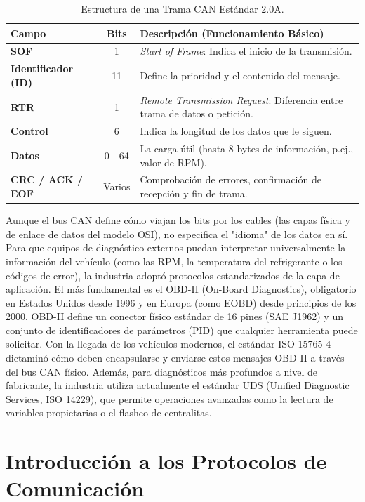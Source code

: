 \begin{table}[!htbp]
\caption{Estructura de una Trama CAN Estándar 2.0A.}
\label{tab:trama_can}
\centering
\begin{tabular}{|l|c|p{9cm}|}
\hline
\textbf{Campo} & \textbf{Bits} & \textbf{Descripción (Funcionamiento Básico)} \\ \hline
\textbf{SOF} & 1 & \textit{Start of Frame}: Indica el inicio de la transmisión. \\ \hline
\textbf{Identificador (ID)} & 11 & Define la prioridad y el contenido del mensaje. \\ \hline
\textbf{RTR} & 1 & \textit{Remote Transmission Request}: Diferencia entre trama de datos o petición. \\ \hline
\textbf{Control} & 6 & Indica la longitud de los datos que le siguen. \\ \hline
\textbf{Datos} & 0 - 64 & La carga útil (hasta 8 bytes de información, p.ej., valor de RPM). \\ \hline
\textbf{CRC / ACK / EOF} & Varios & Comprobación de errores, confirmación de recepción y fin de trama. \\ \hline
\end{tabular}%
\end{table}

Aunque el bus CAN define cómo viajan los bits por los cables (las capas física y de enlace de datos del modelo OSI), no especifica el "idioma" de los datos en sí. Para que equipos de diagnóstico externos puedan interpretar universalmente la información del vehículo (como las RPM, la temperatura del refrigerante o los códigos de error), la industria adoptó protocolos estandarizados de la capa de aplicación. El más fundamental es el OBD-II (On-Board Diagnostics), obligatorio en Estados Unidos desde 1996 y en Europa (como EOBD) desde principios de los 2000. OBD-II define un conector físico estándar de 16 pines (SAE J1962) y un conjunto de identificadores de parámetros (PID) que cualquier herramienta puede solicitar. Con la llegada de los vehículos modernos, el estándar ISO 15765-4 dictaminó cómo deben encapsularse y enviarse estos mensajes OBD-II a través del bus CAN físico. Además, para diagnósticos más profundos a nivel de fabricante, la industria utiliza actualmente el estándar UDS (Unified Diagnostic Services, ISO 14229), que permite operaciones avanzadas como la lectura de variables propietarias o el flasheo de centralitas.



\section{Introducción a los Protocolos de Comunicación}

